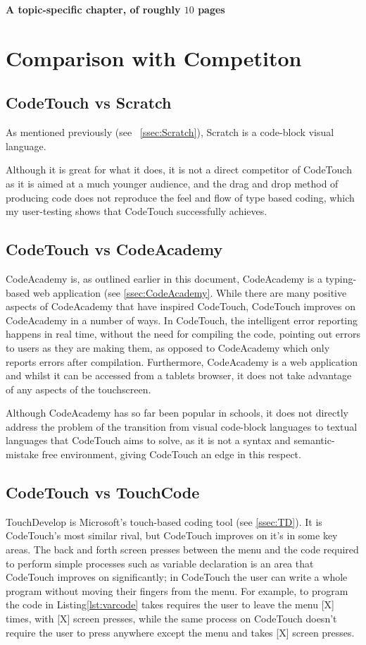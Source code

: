 \documentclass[ %
                    author={Jonathan Rankin},
                supervisor={Dr. David May, Dr. Ian Holyer},
                    degree={MEng},
                     title={CodeTouch},
                  subtitle={A Revolutionary Way To Program Real Code On Touch Screen Devices},
                      type={enterprise},
                      year={2015 } ]{dissertation}
\begin{document}
{\bf A topic-specific chapter, of roughly $10$ pages} 
\vspace{1cm} 

\noindent

\section{Comparison with Competiton}
\subsection{CodeTouch vs Scratch}
As mentioned previously (see ~\ref{ssec:Scratch}), Scratch is a code-block visual language. 

Although it is great for what it does, it is not a direct competitor of CodeTouch as it is aimed at a much younger audience, and the drag and drop method of producing code does not reproduce the feel and flow of type based coding, which my user-testing shows that CodeTouch successfully achieves. 

\subsection{CodeTouch vs CodeAcademy}

CodeAcademy is, as outlined earlier in this document, CodeAcademy is a typing-based web application (see \ref{ssec:CodeAcademy}. While there are many positive aspects of CodeAcademy that have inspired CodeTouch, CodeTouch improves on CodeAcademy in a number of ways. In CodeTouch, the intelligent error reporting happens in real time, without the need for compiling the code, pointing out errors to users as they are making them, as opposed to CodeAcademy which only reports errors after compilation. Furthermore, CodeAcademy is a web application and whilst it can be accessed from a tablets browser, it does not take advantage of any aspects of the touchscreen. 

Although CodeAcademy has so far been popular in schools, it does not directly address the problem of the transition from visual code-block languages to textual languages that CodeTouch aims to solve, as it is not a syntax and semantic-mistake free environment, giving CodeTouch an edge in this respect.


\subsection{CodeTouch vs TouchCode}
TouchDevelop is Microsoft's touch-based coding tool (see \ref{ssec:TD}). It is CodeTouch's most similar rival, but CodeTouch improves on it's in some key areas. The back and forth screen presses between the menu and the code required to perform simple processes such as variable declaration is an area that CodeTouch improves on significantly; in CodeTouch the user can write a whole program without moving their fingers from the menu. For example, to program the code in Listing\ref{lst:varcode} takes requires the user to leave the menu [X] times, with [X] screen presses, while the same process on CodeTouch doesn't require the user to press anywhere except the menu and takes [X] screen presses. 
\end{document}

